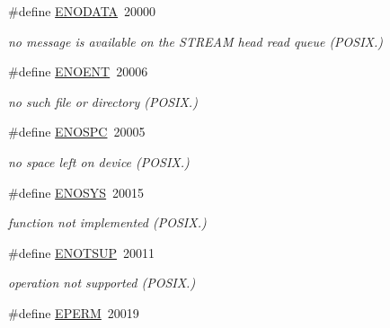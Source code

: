 \begin{DoxyCompactItemize}
\mbox{\label{group__hal_ga0030614bc864d1b24eaedd71585acc27}} 
\#define \hyperlink{group__hal_ga0030614bc864d1b24eaedd71585acc27}{E\+N\+O\+D\+A\+TA}~20000
\begin{DoxyCompactList}\small\item\em no message is available on the S\+T\+R\+E\+AM head read queue (P\+O\+S\+I\+X.) \end{DoxyCompactList}\item 
\mbox{\label{group__hal_ga03e689f378f643d16ea7537918528a48}} 
\#define \hyperlink{group__hal_ga03e689f378f643d16ea7537918528a48}{E\+N\+O\+E\+NT}~20006
\begin{DoxyCompactList}\small\item\em no such file or directory (P\+O\+S\+I\+X.) \end{DoxyCompactList}\item 
\mbox{\label{group__hal_ga088abe8bad2df798edad3053d719b937}} 
\#define \hyperlink{group__hal_ga088abe8bad2df798edad3053d719b937}{E\+N\+O\+S\+PC}~20005
\begin{DoxyCompactList}\small\item\em no space left on device (P\+O\+S\+I\+X.) \end{DoxyCompactList}\item 
\mbox{\label{group__hal_ga43785b9969e0bd1af532dbde06c5540b}} 
\#define \hyperlink{group__hal_ga43785b9969e0bd1af532dbde06c5540b}{E\+N\+O\+S\+YS}~20015
\begin{DoxyCompactList}\small\item\em function not implemented (P\+O\+S\+I\+X.) \end{DoxyCompactList}\item 
\mbox{\label{group__hal_ga91457bbf35f0f1085619a99423bb1f33}} 
\#define \hyperlink{group__hal_ga91457bbf35f0f1085619a99423bb1f33}{E\+N\+O\+T\+S\+UP}~20011
\begin{DoxyCompactList}\small\item\em operation not supported (P\+O\+S\+I\+X.) \end{DoxyCompactList}\item 
\mbox{\label{group__hal_gadd669d31505a077f769cff8e66c780b3}} 
\#define \hyperlink{group__hal_gadd669d31505a077f769cff8e66c780b3}{E\+P\+E\+RM}~20019

\end{DoxyCompactItemize}
